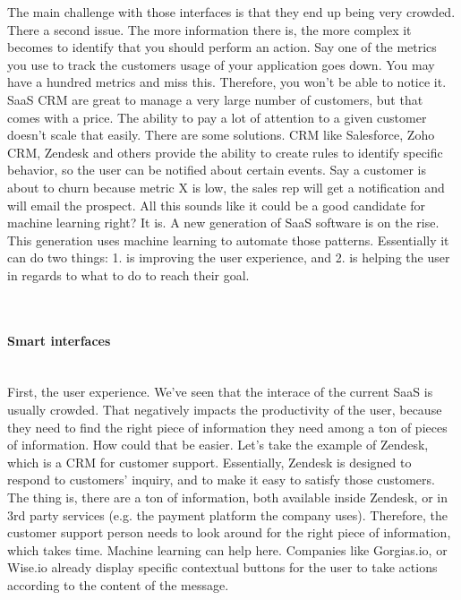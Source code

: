 \documentclass[12pt]{article}
\begin{document}
The main challenge with those interfaces is that they end up being very crowded. There a second issue. The more information there is, the more complex it becomes to identify that you should perform an action. Say one of the metrics you use to track the customers usage of your application goes down. You may have a hundred metrics and miss this. Therefore, you won't be able to notice it.
SaaS CRM are great to manage a very large number of customers, but that comes with a price. The ability to pay a lot of attention to a given customer doesn't scale that easily.
There are some solutions. CRM like Salesforce, Zoho CRM, Zendesk and others provide the ability to create rules to identify specific behavior, so the user can be notified about certain events. Say a customer is about to churn because metric X is low, the sales rep will get a notification and will email the prospect.
All this sounds like it could be a good candidate for machine learning right? It is. A new generation of SaaS software is on the rise. This generation uses machine learning to automate those patterns. Essentially it can do two things: 1. is improving the user experience, and 2. is helping the user in regards to what to do to reach their goal.

\\
\paragraph{Smart interfaces}
\\

First, the user experience. We've seen that the interace of the current SaaS is usually crowded. That negatively impacts the productivity of the user, because they need to find the right piece of information they need among a ton of pieces of information. How could that be easier. Let's take the example of Zendesk, which is a CRM for customer support. Essentially, Zendesk is designed to respond to customers' inquiry, and to make it easy to satisfy those customers. The thing is, there are a ton of information, both available inside Zendesk, or in 3rd party services (e.g. the payment platform the company uses). Therefore, the customer support person needs to look around for the right piece of information, which takes time. Machine learning can help here. Companies like Gorgias.io, or Wise.io already display specific contextual buttons for the user to take actions according to the content of the message.
\end{document}
